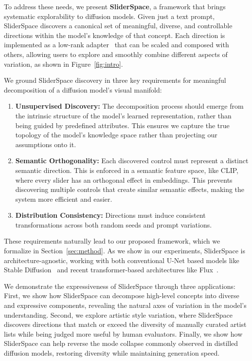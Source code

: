 To address these needs, we present \textbf{SliderSpace}, a framework that brings systematic explorability to diffusion models. Given just a text prompt, SliderSpace discovers a canonical set of meaningful, diverse, and controllable directions within the model's knowledge of that concept. Each direction is implemented as a low-rank adapter~\cite{hu2021lora} that can be scaled and composed with others, allowing users to explore and smoothly combine different aspects of variation, as shown in Figure~\ref{fig:intro}.

We ground SliderSpace discovery in three key requirements for meaningful decomposition of a diffusion model's visual manifold: 
\begin{enumerate}
    \item \textbf{Unsupervised Discovery:} The decomposition process should emerge from the intrinsic structure of the model's learned representation, rather than being guided by predefined attributes. This ensures we capture the true topology of the model's knowledge space rather than projecting our assumptions onto it.
    
    \item \textbf{Semantic Orthogonality:} Each discovered control must represent a distinct semantic direction. This is enforced in a semantic feature space, like CLIP, where every slider has an orthogonal effect in embeddings. This prevents discovering multiple controls that create similar semantic effects, making the system more efficient and easier.
    
    \item \textbf{Distribution Consistency:} Directions must induce consistent transformations across both random seeds and prompt variations. 
\end{enumerate}

These requirements naturally lead to our proposed framework, which we formalize in Section~\ref{sec:method}. As we show in our experiments, SliderSpace is architecture-agnostic, working with both conventional U-Net based models like Stable Diffusion~\cite{rombach2022high, rombach2022sd20, podell2023sdxl, turbo, dmd} and recent transformer-based architectures like Flux~\cite{flux}.

We demonstrate the expressiveness of SliderSpace through three applications: First, we show how SliderSpace can decompose high-level concepts into diverse and expressive components, revealing the natural axes of variation in the model's understanding. Second, we explore artistic style variation, where SliderSpace discovers directions that match or exceed the diversity of manually curated artist lists while being judged more useful by human evaluators. Finally, we show how SliderSpace can help reverse the mode collapse commonly observed in distilled diffusion models, restoring diversity while maintaining generation speed.

